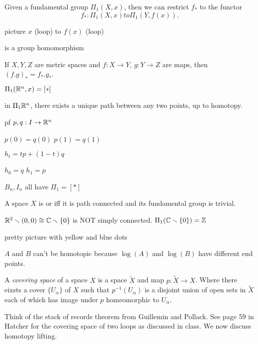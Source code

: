\documentclass[11pt,leqno,oneside]{amsart}
\numberwithin{thm}{section}
\newcommand{\minus}{\smallsetminus}
\begin{document}
\begin{prop}
  Given a fundamental group $\Pi_1(X, x)$, then we can restrict $f_*$
  to the functor $$f_* : \Pi_1(X, x) to \Pi_1(Y, f(x)).$$

  picture $x$ (loop) to $f(x)$ (loop)

  is a group homomorphism
\end{prop}
\begin{prop}
  If $X,Y,Z$ are metric spaces and $f: X \to Y$, $g: Y \to Z$ are
  maps, then ${(f.g)}_* = f_*.g_*$.
\end{prop}

\begin{example}
  $\Pi_1({\mathbb R}^n, x) = [*]$

  in $\Pi_1 {\mathbb R}^n$, there exists a unique path between any two points,
  up to homotopy.

  pf $p,q: I \to {\mathbb R}^n$

  $p(0) = q(0)$ $p(1) = q(1)$

  $h_t = tp + (1-t)q$

  $h_0 = q$ $h_1 = p$

  $B_n, I_n$ all have $\Pi_1 = [*]$
\end{example}

\begin{thm}[Hatcher 1.6]
  A space $X$ is  or  iff it is path connected and its
  fundamental group is trivial.
\end{thm}
\begin{example}
  $\R^2 \minus (0,0) \isom \C \minus \{0\}$ is NOT simply connected.
  $\Pi_1(\C \minus \{0\}) = \Z$
\end{example}
\begin{example}
  pretty picture with yellow and blue dots

  $A$ and $B$ can't be homotopic because $\log(A)$ and $\log(B)$ have
  different end points.
\end{example}

\begin{defn}
  A \emph{covering space} of a space \(X\) is a space \(\tilde{X}\)
  and map \(p \colon \tilde{X} \to X\). Where there eixsts a cover
  \(\{U_\alpha\}\) of \(X\) such that \(p^{-1}(U_\alpha)\) is a
  disjoint union of open sets in \(\tilde{X}\) each of which has image
  under \(p\) homeomorphic to \(U_\alpha\).
\end{defn}

Think of the stack of records theorem from Guillemin and Pollack. See
page 59 in Hatcher for the covering space of two loops as discussed in
class. We now discuss homotopy lifting.
\end{document}
